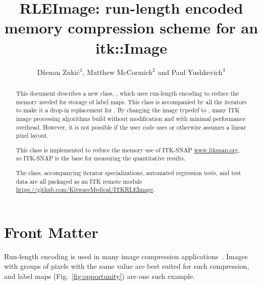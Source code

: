 \documentclass{InsightArticle}
\title{RLEImage: run-length encoded memory compression scheme for an itk::Image}
\author{D{\v z}enan Zuki{\' c}$^{1}$, Matthew McCormick$^{2}$ and Paul Yushkevich$^{3}$}
\newcommand{\IJhandlerIDnumber}{1338}
\begin{document}
\IJhandlefooter{\IJhandlerIDnumber}

\ifpdf
\else
\fi

\maketitle

\ifhtml
\chapter*{Front Matter\label{front}}
\fi


\begin{abstract}
\noindent
This document describes a new class, ,
which uses run-length encoding to reduce the memory needed for storage of label maps.
This class is accompanied by all the iterators
to make it a drop-in replacement for .
By changing the image typedef to ,
many ITK image processing algorithms build without modification and
with minimal performance overhead.
However, it is not possible if the user code
uses  or otherwise assumes a linear pixel layout.

This class is implemented to reduce the memory use of ITK-SNAP \url{www.itksnap.org},
so ITK-SNAP is the base for measuring the quantitative results.

The class, accompanying iterator specializations, automated regression tests, and test data
are all packaged as an ITK remote module \url{https://github.com/KitwareMedical/ITKRLEImage}.
\end{abstract}

\IJhandlenote{\IJhandlerIDnumber}

\tableofcontents


Run-length encoding is used in many image compression applications~\cite{wikiRLE}.
Images with groups of pixels with the same value are best suited for such compression,
and label maps (Fig.~\ref{fig:opportunity}) are one such example.
\end{document}
